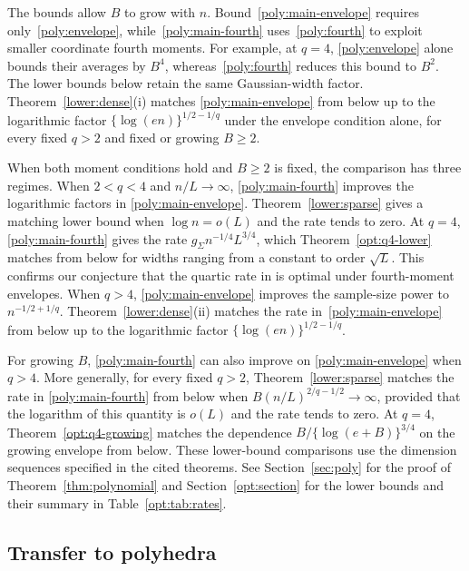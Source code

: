 \documentclass[11pt,letterpaper]{article}
\newenvironment{recovered}{}{}
\newcommand{\vSix}[1]{{\color{magenta}#1}}
\theoremstyle{remark}
\begin{document}
\begin{recovered}
The bounds allow \(B\) to grow with \(n\).
Bound~\eqref{poly:main-envelope} requires only~\eqref{poly:envelope},
while~\eqref{poly:main-fourth} uses~\eqref{poly:fourth} to exploit
smaller coordinate fourth moments. For example, at \(q=4\),
\eqref{poly:envelope} alone bounds their averages by \(B^4\),
whereas~\eqref{poly:fourth} reduces this bound to \(B^2\).
\vSix{The lower bounds below retain the same Gaussian-width factor.}
Theorem~\ref{lower:dense}\textup{(i)} matches
\eqref{poly:main-envelope} from below up to the logarithmic factor
\(\{\log(en)\}^{1/2-1/q}\) under the envelope condition alone,
for every fixed \(q>2\) and fixed or growing \(B\ge2\).

When both moment conditions hold and \(B\ge2\) is fixed, the
comparison has three regimes.
When \(2<q<4\) and \(n/L\to\infty\),
\eqref{poly:main-fourth} improves the logarithmic factors in
\eqref{poly:main-envelope}. Theorem~\ref{lower:sparse} gives a
matching lower bound when \(\log n=o(L)\) and the rate tends to zero.
At \(q=4\), \eqref{poly:main-fourth} gives the rate
\vSix{\(g_\Sigma n^{-1/4}L^{3/4}\), which
Theorem~\ref{opt:q4-lower} matches from below for widths ranging
from a constant to order \(\sqrt L\).}
This confirms our conjecture that the quartic rate in
\cite[Theorem~2.5]{CCKK2022} is optimal under fourth-moment envelopes.
When \(q>4\), \eqref{poly:main-envelope} improves the sample-size
power to \(n^{-1/2+1/q}\). Theorem~\ref{lower:dense}\textup{(ii)} matches the
rate in~\eqref{poly:main-envelope} from below up to the logarithmic factor
\(\{\log(en)\}^{1/2-1/q}\).

For growing \(B\), \eqref{poly:main-fourth} can also improve on
\eqref{poly:main-envelope} when \(q>4\). More generally, for every
fixed \(q>2\), Theorem~\ref{lower:sparse} matches the rate in
\eqref{poly:main-fourth} from below when \(B(n/L)^{2/q-1/2}\to\infty\),
provided that the logarithm of this quantity is \(o(L)\) and the
rate tends to zero. At \(q=4\), Theorem~\ref{opt:q4-growing}
matches the dependence \(B/\{\log(e+B)\}^{3/4}\) on the growing
envelope from below. These lower-bound comparisons use the dimension sequences
specified in the cited theorems. See Section~\ref{sec:poly} for
the proof of Theorem~\ref{thm:polynomial} and
Section~\ref{opt:section} for the lower bounds and their summary
in Table~\ref{opt:tab:rates}.
\end{recovered}

\subsection{Transfer to polyhedra}\label{sec:polyhedral-transfer}
\end{document}
